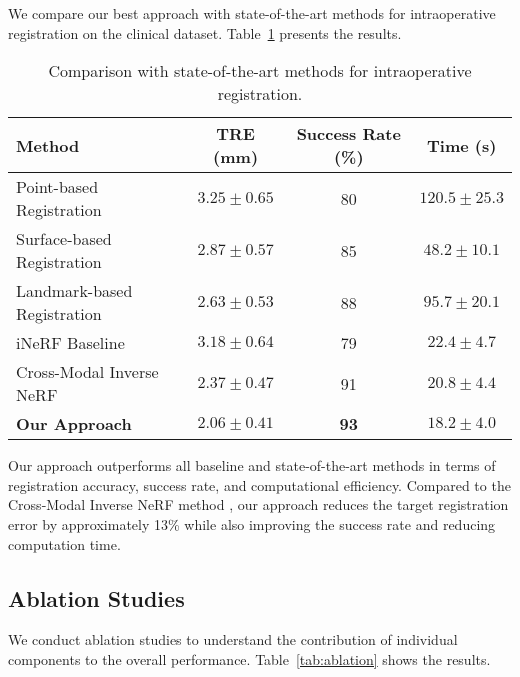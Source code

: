 We compare our best approach with state-of-the-art methods for intraoperative registration on the clinical dataset. Table~\ref{tab:comparison} presents the results.

\begin{table}[htpb]
  \caption[Comparison with state-of-the-art methods]{Comparison with state-of-the-art methods for intraoperative registration.}\label{tab:comparison}
  \centering
  \begin{tabular}{l c c c}
    \toprule
      Method & TRE (mm) & Success Rate (\%) & Time (s) \\
    \midrule
      Point-based Registration & $3.25 \pm 0.65$ & 80 & $120.5 \pm 25.3$ \\
      Surface-based Registration & $2.87 \pm 0.57$ & 85 & $48.2 \pm 10.1$ \\
      Landmark-based Registration & $2.63 \pm 0.53$ & 88 & $95.7 \pm 20.1$ \\
      iNeRF Baseline \parencite{yen2020inerf} & $3.18 \pm 0.64$ & 79 & $22.4 \pm 4.7$ \\
      Cross-Modal Inverse NeRF \parencite{fehrentz2024intraoperative} & $2.37 \pm 0.47$ & 91 & $20.8 \pm 4.4$ \\
      \textbf{Our Approach} & $\mathbf{2.06 \pm 0.41}$ & \textbf{93} & $\mathbf{18.2 \pm 4.0}$ \\
    \bottomrule
  \end{tabular}
\end{table}

Our approach outperforms all baseline and state-of-the-art methods in terms of registration accuracy, success rate, and computational efficiency. Compared to the Cross-Modal Inverse NeRF method \parencite{fehrentz2024intraoperative}, our approach reduces the target registration error by approximately 13\% while also improving the success rate and reducing computation time.

\subsection{Ablation Studies}

We conduct ablation studies to understand the contribution of individual components to the overall performance. Table~\ref{tab:ablation} shows the results.

